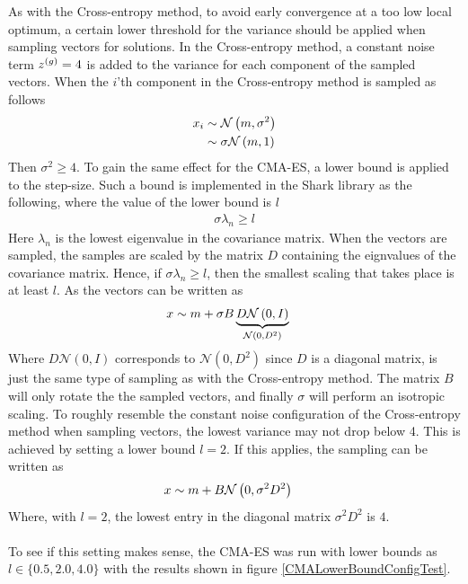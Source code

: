 As with the Cross-entropy method, to avoid early convergence
at a too low local optimum, a 
certain lower threshold for the variance should be applied when 
sampling vectors for solutions. In the Cross-entropy method, a constant 
noise term $z^{(g)} = 4$ is added to the variance for each component
of the sampled vectors. When the $i$'th component in the Cross-entropy method is
sampled as follows
\begin{align*}
x_i &\sim \mathcal{N}\left(m, \sigma^{2}\right)\\
              &\sim \sigma \mathcal{N}\left(m, 1\right)
\end{align*}
Then $\sigma^{2} \geq 4$. To gain the same effect for the CMA-ES, a lower bound 
is applied to the step-size. Such a bound is implemented in the Shark library
as the following, where the value of the lower bound is $l$
\begin{align*}
\sigma  \lambda_n \geq l
\end{align*}
Here $\lambda_n$ is the lowest eigenvalue in the covariance matrix. 
When the vectors are sampled, the samples are scaled by the matrix $D$
containing the eignvalues of the covariance matrix. 
Hence, if $\sigma \lambda_n \geq l$, then the smallest scaling
that takes place is at least $l$. As the vectors can be written 
as
\begin{align*}
x &\sim m + \sigma B 
\underbrace{D \mathcal{N}\left(0, I \right)}_{\mathcal{N}\left(0, D^2 \right)}
\end{align*}
Where $D \mathcal{N}\left(0, I \right)$ corresponds to 
$\mathcal{N}\left(0, D^2 \right)$ since $D$ is a diagonal
matrix, is just the same type of sampling as with the Cross-entropy method. 
The matrix $B$ will only rotate the the sampled vectors, and finally
$\sigma$ will perform an isotropic scaling. 
To roughly resemble the constant noise configuration of the Cross-entropy method
when sampling vectors, the lowest variance may not drop below 4. 
This is achieved by setting a lower bound $l=2$. If this applies,
the sampling can be written as
\begin{align*}
x &\sim m +  B \mathcal{N}\left(0, \sigma^2 D^2 \right)
\end{align*}
Where, with $l=2$, the lowest entry in the diagonal matrix $\sigma^2 D^2$
is $4$.\\
\\
To see if this setting makes sense, the CMA-ES was run with lower bounds as 
$l \in \{0.5, 2.0, 4.0\}$ with the results shown in figure \ref{CMALowerBoundConfigTest}.

